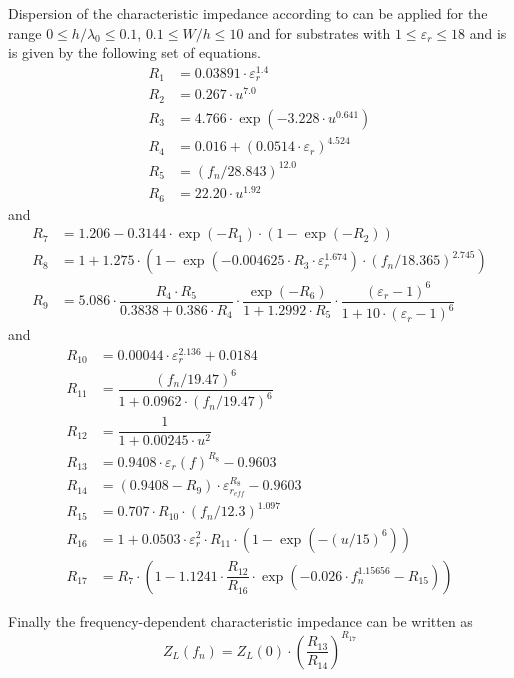 \documentclass[10pt]{report}
\begin{document}
Dispersion of the characteristic impedance according to
\cite{Kirschning1} can be applied for the range $0 \le h/\lambda_0 \le
0.1$, $0.1 \le W/h \le 10$ and for substrates with $1 \le
\varepsilon_r \le 18$ and is is given by the following set of
equations.
\begin{align}
R_1 &= 0.03891\cdot \varepsilon_r^{1.4}\\
R_2 &= 0.267\cdot u^{7.0}\\
R_3 &= 4.766\cdot \exp{ \left(-3.228\cdot u^{0.641}\right)}\\
R_4 &= 0.016 + \left(0.0514\cdot \varepsilon_r\right)^{4.524}\\
R_5 &= \left(f_n / 28.843\right)^{12.0}\\
R_6 &= 22.20\cdot u^{1.92}
\end{align}
and
\begin{align}
R_7 &= 1.206 - 0.3144\cdot \exp{\left(-R_1\right)}\cdot \left(1 - \exp{\left(-R_2\right)}\right)\\
R_8 &= 1 + 1.275\cdot \left(1 - \exp{ \left(-0.004625\cdot R_3\cdot \varepsilon_r^{1.674}\right)} \cdot \left(f_n / 18.365\right)^{2.745}\right)\\
R_9 &= 5.086\cdot \dfrac{R_4\cdot R_5}{0.3838 + 0.386\cdot R_4}\cdot \dfrac{\exp{\left(-R_6\right)}}{1 + 1.2992\cdot R_5}\cdot \dfrac{\left(\varepsilon_r - 1\right)^6}{1 + 10\cdot \left(\varepsilon_r - 1\right)^6}
\end{align}
and
\begin{align}
R_{10} &= 0.00044\cdot \varepsilon_r^{2.136} + 0.0184\\
R_{11} &= \dfrac{\left(f_n / 19.47\right)^6}{1 + 0.0962\cdot \left(f_n / 19.47\right)^6}\\
R_{12} &= \dfrac{1}{1 + 0.00245\cdot u^2}\\
R_{13} &= 0.9408\cdot \varepsilon_{r}(f)^{R_8} - 0.9603\\
R_{14} &= \left(0.9408 - R_9\right)\cdot \varepsilon_{r_{eff}}^{R_8} - 0.9603\\
R_{15} &= 0.707\cdot R_{10}\cdot \left(f_n / 12.3\right)^{1.097}\\
R_{16} &= 1 + 0.0503\cdot \varepsilon_r^2\cdot R_{11}\cdot \left(1 - \exp{ \left(- \left(u / 15\right)^6\right)}\right)\\
\label{eq:KirschningR17}
R_{17} &= R_7\cdot \left(1 - 1.1241\cdot \dfrac{R_{12}}{R_{16}}\cdot \exp{ \left(-0.026\cdot f_n^{1.15656} - R_{15}\right)}\right)
\end{align}

Finally the frequency-dependent characteristic impedance can be
written as
\begin{equation}
\label{eq:KirschningZLdisp}
Z_L(f_n) = Z_L(0)\cdot \left(\dfrac{R_{13}}{R_{14}}\right)^{R_{17}}
\end{equation}
\end{document}
